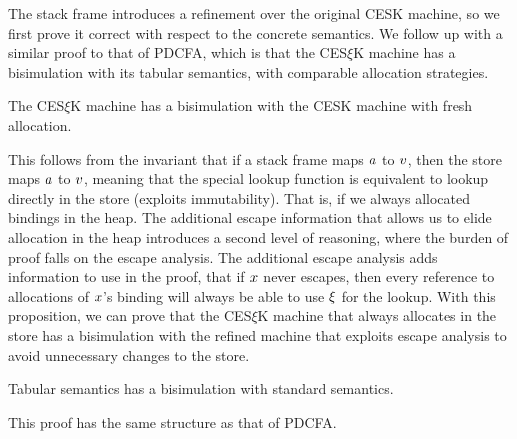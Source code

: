 The stack frame introduces a refinement over the original CESK machine, so we first prove it correct with respect to the concrete semantics.
%
We follow up with a similar proof to that of PDCFA, which is that the CES$\xi$K machine has a bisimulation with its tabular semantics, with comparable allocation strategies.
\begin{theorem}\label{thm:refinement}
  The CES$\xi$K machine has a bisimulation with the CESK machine with fresh allocation.
\end{theorem}
This follows from the invariant that if a stack frame maps $a$ to $v$, then the store maps $a$ to $v$, meaning that the special lookup function is equivalent to lookup directly in the store (exploits immutability).
%
That is, if we always allocated bindings in the heap.
%
The additional escape information that allows us to elide allocation in the heap introduces a second level of reasoning, where the burden of proof falls on the escape analysis.
%
The additional escape analysis adds information to use in the proof, that if $x$ never escapes, then every reference to allocations of $x$'s binding will always be able to use $\xi$ for the lookup.
%
With this proposition, we can prove that the CES$\xi$K machine that always allocates in the store has a bisimulation with the refined machine that exploits escape analysis to avoid unnecessary changes to the store.
%

\begin{theorem}\label{thm:cfa2}
  Tabular semantics has a bisimulation with standard semantics.
\end{theorem}
This proof has the same structure as that of PDCFA.

